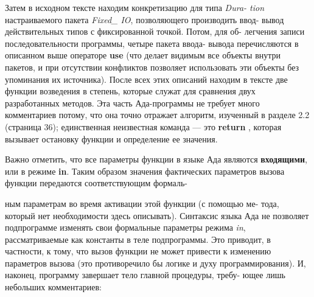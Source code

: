 Затем в исходном тексте находим конкретизацию для типа {\it Dura­-\linebreak
tion} настраиваемого пакета {\it Fixed\_ IO}, позволяющего производить ввод-\linebreak
вывод действительных типов с фиксированной точкой. Потом, для об­-\linebreak
легчения записи последовательности программы, четыре пакета ввода-\linebreak
вывода перечисляются в описанном выше операторе {\bf use} (что делает\linebreak
видимым все объекты внутри пакетов, и при отсутствии конфликтов\linebreak
позволяет использовать эти объекты без упоминания их источника).\linebreak
После всех этих описаний находим в тексте две функции возведения\linebreak
в степень, которые служат для сравнения двух разработанных методов.\linebreak
Эта часть Ада-программы не требует много комментариев потому, что\linebreak
она точно отражает алгоритм, изученный в разделе 2.2 (страница 36);\linebreak
единственная неизвестная команда — это {\bf return} , которая вызывает\linebreak
остановку функции и определение ее значения.

Важно отметить, что все параметры функции в языке Ада являются\linebreak
{\bf входящими}, или в режиме {\bf in}. Таким образом значения фактических\linebreak
параметров вызова функции передаются соответствующим формаль-\linebreak
\newpage


\noindent ным параметрам во время активации этой функции (с помощью ме­-\linebreak
тода, который нет необходимости здесь описывать). Синтаксис языка\linebreak
Ада не позволяет подпрограмме изменять свои формальные параметры\linebreak
режима {\it in}, рассматриваемые как константы в теле подпрограммы. Это\linebreak
приводит, в частности, к тому, что вызов функции не может привести\linebreak
к изменению параметров вызова (это противоречило бы логике и духу\linebreak
программирования).
И, наконец, программу завершает тело главной процедуры, требу­-\linebreak
ющее лишь небольших комментариев:

